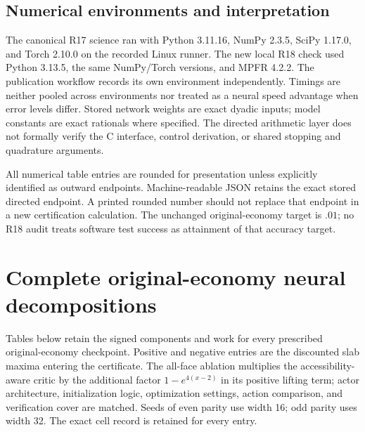 \subsection{Numerical environments and interpretation}
The canonical R17 science ran with Python 3.11.16, NumPy 2.3.5, SciPy 1.17.0, and Torch 2.10.0 on the recorded Linux runner. The new local R18 check used Python 3.13.5, the same NumPy/Torch versions, and MPFR 4.2.2. The publication workflow records its own environment independently. Timings are neither pooled across environments nor treated as a neural speed advantage when error levels differ. Stored network weights are exact dyadic inputs; model constants are exact rationals where specified. The directed arithmetic layer does not formally verify the C interface, control derivation, or shared stopping and quadrature arguments.

All numerical table entries are rounded for presentation unless explicitly identified as outward endpoints. Machine-readable JSON retains the exact stored directed endpoint. A printed rounded number should not replace that endpoint in a new certification calculation. The unchanged original-economy target is $.01$; no R18 audit treats software test success as attainment of that accuracy target.

\section{Complete original-economy neural decompositions}\label{supp:r18decomposition}
Tables below retain the signed components and work for every prescribed original-economy checkpoint. Positive and negative entries are the discounted slab maxima entering the certificate. The all-face ablation multiplies the accessibility-aware critic by the additional factor $1-e^{4(x-2)}$ in its positive lifting term; actor architecture, initialization logic, optimization settings, action comparison, and verification cover are matched. Seeds of even parity use width 16; odd parity uses width 32. The exact cell record is retained for every entry.

